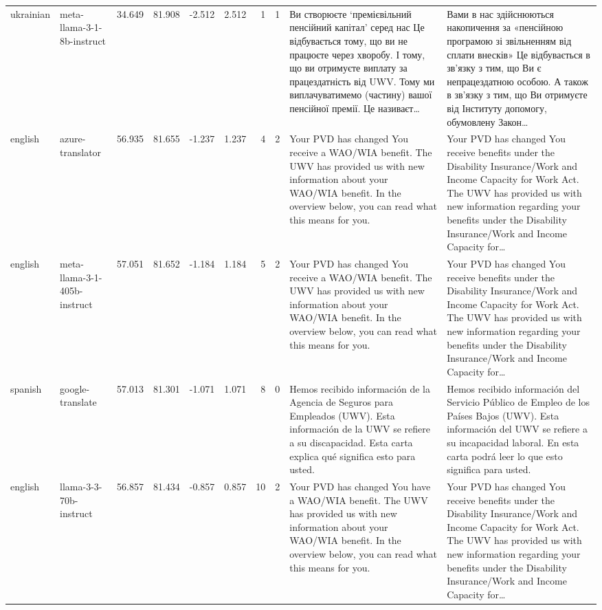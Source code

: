 \begin{tabular}{llrrrrrrll}
ukrainian & meta-llama-3-1-8b-instruct & 34.649 & 81.908 & -2.512 & 2.512 & 1 & 1 & Ви створюєте ‘премієвільний пенсійний капітал’ серед нас Це відбувається тому, що ви не працюєте через хворобу. І тому, що ви отримуєте виплату за працездатність від UWV. Тому ми виплачуватимемо (частину) вашої пенсійної премії. Це називаєт… & Вами в нас здійснюються накопичення за «пенсійною програмою зі звільненням від сплати внесків» Це відбувається в зв'язку з тим, що Ви є непрацездатною особою. А також в зв'язку з тим, що Ви отримуєте від Інституту допомогу, обумовлену Закон… \\
english & azure-translator & 56.935 & 81.655 & -1.237 & 1.237 & 4 & 2 & Your PVD has changed You receive a WAO/WIA benefit. The UWV has provided us with new information about your WAO/WIA benefit. In the overview below, you can read what this means for you. & Your PVD has changed You receive benefits under the Disability Insurance/Work and Income Capacity for Work Act. The UWV has provided us with new information regarding your benefits under the Disability Insurance/Work and Income Capacity for… \\
english & meta-llama-3-1-405b-instruct & 57.051 & 81.652 & -1.184 & 1.184 & 5 & 2 & Your PVD has changed You receive a WAO/WIA benefit. The UWV has provided us with new information about your WAO/WIA benefit. In the overview below, you can read what this means for you. & Your PVD has changed You receive benefits under the Disability Insurance/Work and Income Capacity for Work Act. The UWV has provided us with new information regarding your benefits under the Disability Insurance/Work and Income Capacity for… \\
spanish & google-translate & 57.013 & 81.301 & -1.071 & 1.071 & 8 & 0 & Hemos recibido información de la Agencia de Seguros para Empleados (UWV). Esta información de la UWV se refiere a su discapacidad. Esta carta explica qué significa esto para usted. & Hemos recibido información del Servicio Público de Empleo de los Países Bajos (UWV). Esta información del UWV se refiere a su incapacidad laboral. En esta carta podrá leer lo que esto significa para usted. \\
english & llama-3-3-70b-instruct & 56.857 & 81.434 & -0.857 & 0.857 & 10 & 2 & Your PVD has changed You have a WAO/WIA benefit. The UWV has provided us with new information about your WAO/WIA benefit. In the overview below, you can read what this means for you. & Your PVD has changed You receive benefits under the Disability Insurance/Work and Income Capacity for Work Act. The UWV has provided us with new information regarding your benefits under the Disability Insurance/Work and Income Capacity for… \\
\bottomrule
\end{tabular}
